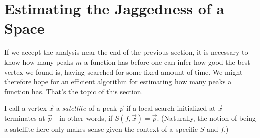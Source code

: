 \documentclass[11pt]{article}
\begin{document}
\section{Estimating the Jaggedness of a Space}

If we accept the analysis near the end of the previous section, it is necessary to know how many peaks $m$ a function has before one can infer how good the best vertex we found is, having searched for some fixed amount of time. We might therefore hope for an efficient algorithm for estimating how many peaks a function has. That's the topic of this section.

I call a vertex $\vec{x}$ a \emph{satellite} of a peak $\vec{p}$ if a local search initialized at $\vec{x}$ terminates at $\vec{p}$---in other words, if $S(f, \vec{x}) = \vec{p}$. (Naturally, the notion of being a satellite here only makes sense given the context of a specific $S$ and $f$.)
\end{document}
